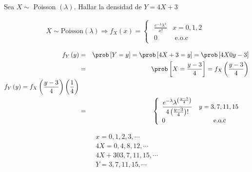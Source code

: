 \begin{Ejem}
Sea $X \sim $ Poisson $\left(\lambda\right)$. Hallar la densidad de $Y=4X+3$

\begin{eqnarray*}
X\sim \textrm{Poisson}\left(\lambda\right) \Rightarrow f_{X}\left(x\right)=
\begin{cases}
\begin{array}{lc}
\frac{e^{-\lambda}\lambda^{x}}{x!} & x=0,1,2\\
0 & \textrm{ e.o.c}
\end{array}
\end{cases}
\end{eqnarray*}

\begin{eqnarray*}
f_{Y}\left(y\right)&=& \prob\left[Y=y\right]= \prob\left[4X+3=y\right]=\prob\left[4X0y-3\right]\\
&=&\prob\left[X=\frac{y-3}{4}\right]=f_{X}\left(\frac{y-3}{4}\right)\\
f_{Y}\left(y\right)=f_{X}\left(\frac{y-3}{4}\right)\left(\dfrac{1}{4}\right) \\
&=& 
\begin{cases}
\begin{array}{lc}
\dfrac{e^{-\lambda} \lambda^{\left(\frac{y-3}{4}\right)}}{4\left(\frac{y-3}{4}\right)!} & y=3,7,11,15\\
0 & \textrm{ e.o.c}
\end{array}
\end{cases}
\end{eqnarray*}

\begin{eqnarray*}
x=0,1,2,3,\cdots \\
4X=0,4,8,12, \cdots \\
4X+303,7,11,15, \cdots \\
Y=3,7,11,15, \cdots \\
\end{eqnarray*}
\end{Ejem}

